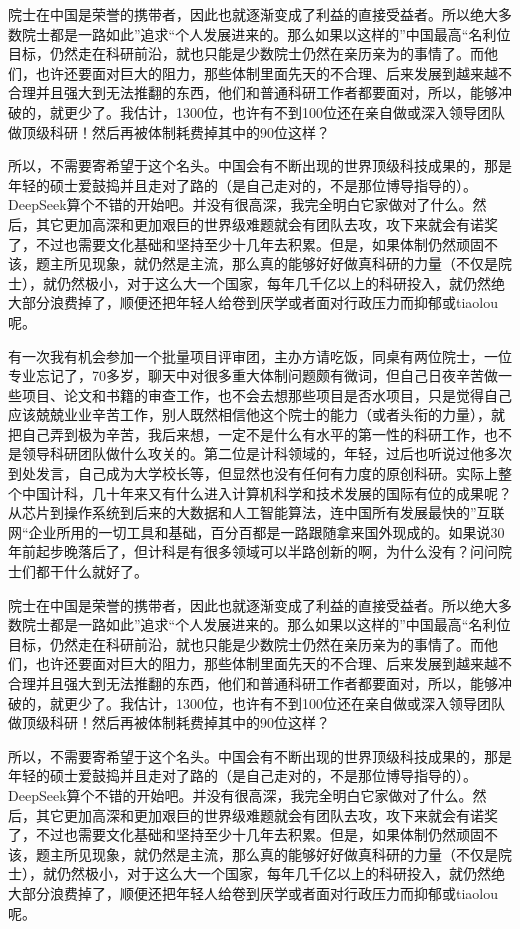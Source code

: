 \documentclass[12pt,twocolumn]{article}
\begin{document}
院士在中国是荣誉的携带者，因此也就逐渐变成了利益的直接受益者。所以绝大多数院士都是一路如此”追求“个人发展进来的。那么如果以这样的”中国最高“名利位目标，仍然走在科研前沿，就也只能是少数院士仍然在亲历亲为的事情了。而他们，也许还要面对巨大的阻力，那些体制里面先天的不合理、后来发展到越来越不合理并且强大到无法推翻的东西，他们和普通科研工作者都要面对，所以，能够冲破的，就更少了。我估计，1300位，也许有不到100位还在亲自做或深入领导团队做顶级科研！然后再被体制耗费掉其中的90位这样？

所以，不需要寄希望于这个名头。中国会有不断出现的世界顶级科技成果的，那是年轻的硕士爱鼓捣并且走对了路的（是自己走对的，不是那位博导指导的）。DeepSeek算个不错的开始吧。并没有很高深，我完全明白它家做对了什么。然后，其它更加高深和更加艰巨的世界级难题就会有团队去攻，攻下来就会有诺奖了，不过也需要文化基础和坚持至少十几年去积累。但是，如果体制仍然顽固不该，题主所见现象，就仍然是主流，那么真的能够好好做真科研的力量（不仅是院士），就仍然极小，对于这么大一个国家，每年几千亿以上的科研投入，就仍然绝大部分浪费掉了，顺便还把年轻人给卷到厌学或者面对行政压力而抑郁或tiaolou呢。

有一次我有机会参加一个批量项目评审团，主办方请吃饭，同桌有两位院士，一位专业忘记了，70多岁，聊天中对很多重大体制问题颇有微词，但自己日夜辛苦做一些项目、论文和书籍的审查工作，也不会去想那些项目是否水项目，只是觉得自己应该兢兢业业辛苦工作，别人既然相信他这个院士的能力（或者头衔的力量），就把自己弄到极为辛苦，我后来想，一定不是什么有水平的第一性的科研工作，也不是领导科研团队做什么攻关的。第二位是计科领域的，年轻，过后也听说过他多次到处发言，自己成为大学校长等，但显然也没有任何有力度的原创科研。实际上整个中国计科，几十年来又有什么进入计算机科学和技术发展的国际有位的成果呢？从芯片到操作系统到后来的大数据和人工智能算法，连中国所有发展最快的”互联网“企业所用的一切工具和基础，百分百都是一路跟随拿来国外现成的。如果说30年前起步晚落后了，但计科是有很多领域可以半路创新的啊，为什么没有？问问院士们都干什么就好了。

院士在中国是荣誉的携带者，因此也就逐渐变成了利益的直接受益者。所以绝大多数院士都是一路如此”追求“个人发展进来的。那么如果以这样的”中国最高“名利位目标，仍然走在科研前沿，就也只能是少数院士仍然在亲历亲为的事情了。而他们，也许还要面对巨大的阻力，那些体制里面先天的不合理、后来发展到越来越不合理并且强大到无法推翻的东西，他们和普通科研工作者都要面对，所以，能够冲破的，就更少了。我估计，1300位，也许有不到100位还在亲自做或深入领导团队做顶级科研！然后再被体制耗费掉其中的90位这样？

所以，不需要寄希望于这个名头。中国会有不断出现的世界顶级科技成果的，那是年轻的硕士爱鼓捣并且走对了路的（是自己走对的，不是那位博导指导的）。DeepSeek算个不错的开始吧。并没有很高深，我完全明白它家做对了什么。然后，其它更加高深和更加艰巨的世界级难题就会有团队去攻，攻下来就会有诺奖了，不过也需要文化基础和坚持至少十几年去积累。但是，如果体制仍然顽固不该，题主所见现象，就仍然是主流，那么真的能够好好做真科研的力量（不仅是院士），就仍然极小，对于这么大一个国家，每年几千亿以上的科研投入，就仍然绝大部分浪费掉了，顺便还把年轻人给卷到厌学或者面对行政压力而抑郁或tiaolou呢。
\end{document}
